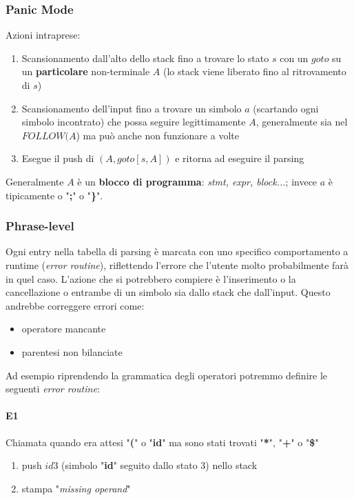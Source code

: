 \subsubsection{Panic Mode}
Azioni intraprese:
\begin{enumerate}
\item Scansionamento dall'alto dello stack fino a trovare lo stato $s$ con un
$goto$ su un \textbf{particolare} non-terminale $A$ (lo stack viene liberato
fino al ritrovamento di $s$)
\item Scansionamento dell'input fino a trovare un simbolo $a$ (scartando ogni
simbolo incontrato) che possa seguire legittimamente $A$, generalmente sia nel
$FOLLOW(A$) ma pu\`o anche non funzionare a volte
\item Esegue il push di $(A,goto[s,A])$ e ritorna ad eseguire il parsing
\end{enumerate}

Generalmente $A$ \`e un \textbf{blocco di programma}: \textit{stmt, expr,
block...}; invece $a$ \`e tipicamente o "\textbf{;}" o "\textbf{\}}".

\subsubsection{Phrase-level}
Ogni entry nella tabella di parsing \`e marcata con uno specifico comportamento
a runtime (\textit{error routine}), riflettendo l'errore che l'utente molto
probabilmente far\`a in quel caso. L'azione che si potrebbero compiere \`e
l'inserimento o la cancellazione o entrambe di un simbolo sia dallo stack che
dall'input. Questo andrebbe correggere errori come:
\begin{itemize}
\item operatore mancante
\item parentesi non bilanciate
\end{itemize}

Ad esempio riprendendo la grammatica degli operatori potremmo definire le
seguenti \textit{error routine}:
\paragraph{E1}
Chiamata quando era attesi "\textbf{(}" o "\textbf{id}" ma sono stati trovati
"\textbf{*}", "\textbf{+}" o "\textbf{\$}"
\begin{enumerate}
\item push $id3$ (simbolo "\textbf{id}" seguito dallo stato 3) nello stack
\item stampa "\textit{missing operand}"
\end{enumerate}

